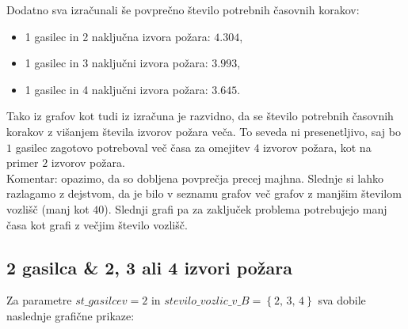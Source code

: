 \documentclass[a4paper, 12pt]{article}
\begin{document}
\begin{figure}[!htb]
    \endminipage
\end{figure}
    
\noindent Dodatno sva izračunali še povprečno število potrebnih časovnih korakov:
\begin{itemize}
    \item 1 gasilec in 2 naključna izvora požara: $4.304$,
    \item 1 gasilec in 3 naključni izvora požara: $3.993$,
    \item 1 gasilec in 4 naključni izvora požara: $3.645$.
\end{itemize}

\noindent Tako iz grafov kot tudi iz izračuna je razvidno, da se število potrebnih časovnih korakov
z višanjem števila izvorov požara veča. To seveda ni presenetljivo, saj bo $1$ gasilec zagotovo
potreboval več časa za omejitev $4$ izvorov požara, kot na primer $2$ izvorov požara. \\

\noindent Komentar: opazimo, da so dobljena povprečja precej majhna. Slednje si lahko razlagamo z dejstvom, da je bilo v
seznamu grafov več grafov z manjšim številom vozlišč (manj kot $40$). Slednji grafi pa
za zaključek problema potrebujejo manj časa kot grafi z večjim število vozlišč. 

\subsection{2 gasilca \& 2, 3 ali 4 izvori požara}

Za parametre $st\_gasilcev = 2$ in $stevilo\_vozlic\_v\_B = \left\{ 2, \, 3, \, 4 \right\}$ sva dobile
naslednje grafične prikaze:
\end{document}
